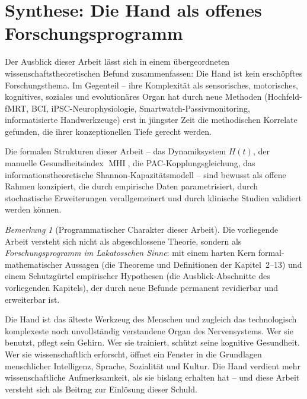 ﻿\documentclass[12pt,a4paper]{report}
\theoremstyle{plain}
\theoremstyle{definition}
\theoremstyle{remark}
\newtheorem{bemerkung}[theorem]{Bemerkung}
\DeclareMathOperator{\MHI}{MHI}
\begin{document}
\section{Synthese: Die Hand als offenes Forschungsprogramm}

Der Ausblick dieser Arbeit lässt sich in einem übergeordneten
wissenschaftstheoretischen Befund zusammenfassen: Die Hand ist kein
erschöpftes Forschungsthema. Im Gegenteil -- ihre Komplexität als
sensorisches, motorisches, kognitives, soziales und evolutionäres Organ
hat durch neue Methoden (Hochfeld-fMRT, BCI, iPSC-Neurophysiologie,
Smartwatch-Passivmonitoring, informatisierte Handwerkzeuge) erst in
jüngster Zeit die methodischen Korrelate gefunden, die ihrer konzeptionellen
Tiefe gerecht werden.

Die formalen Strukturen dieser Arbeit -- das Dynamiksystem $H(t)$,
der manuelle Gesundheitsindex $\MHI$, die PAC-Kopplungsgleichung,
das informationstheoretische Shannon-Kapazitätsmodell -- sind bewusst
als offene Rahmen konzipiert, die durch empirische Daten parametrisiert,
durch stochastische Erweiterungen verallgemeinert und durch klinische
Studien validiert werden können.

\begin{bemerkung}[Programmatischer Charakter dieser Arbeit]
Die vorliegende Arbeit versteht sich nicht als abgeschlossene
Theorie, sondern als \emph{Forschungsprogramm im Lakatosschen Sinne}:
mit einem harten Kern formal-mathematischer Aussagen (die
Theoreme und Definitionen der Kapitel~2--13) und einem
Schutzgürtel empirischer Hypothesen (die Ausblick-Abschnitte
des vorliegenden Kapitels), der durch neue Befunde permanent
revidierbar und erweiterbar ist.
\end{bemerkung}

Die Hand ist das älteste Werkzeug des Menschen und zugleich das
technologisch komplexeste noch unvollständig verstandene Organ des
Nervensystems. Wer sie benutzt, pflegt sein Gehirn. Wer sie trainiert,
schützt seine kognitive Gesundheit. Wer sie wissenschaftlich erforscht,
öffnet ein Fenster in die Grundlagen menschlicher Intelligenz, Sprache,
Sozialität und Kultur. Die Hand verdient mehr wissenschaftliche
Aufmerksamkeit, als sie bislang erhalten hat -- und diese Arbeit
versteht sich als Beitrag zur Einlösung dieser Schuld.
\end{document}
